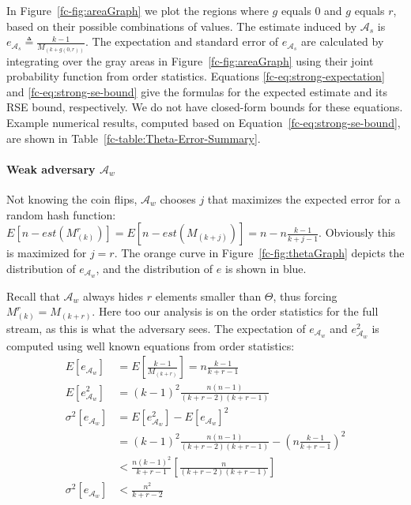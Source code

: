 In Figure~\ref{fc-fig:areaGraph} we plot the regions where $g$ equals $0$
and $g$ equals $r$, based on their possible combinations of values. The estimate
induced by ${\mathcal{A}}_s$ is $e_{{\mathcal{A}}_s} \triangleq \frac{k-1}{M_{(k+g(0,r))}}$. The expectation
and standard error of $e_{{\mathcal{A}}_s}$ are calculated by integrating over the gray areas
in Figure~\ref{fc-fig:areaGraph} using their joint probability function from order statistics. %
Equations \ref{fc-eq:strong-expectation} and \ref{fc-eq:strong-se-bound} give
the formulas for the expected estimate and its RSE bound, respectively. We do not have
closed-form bounds for these equations. Example numerical results, computed based on Equation~\ref{fc-eq:strong-se-bound}, are
shown in Table~\ref{fc-table:Theta-Error-Summary}.

\paragraph{Weak adversary ${\mathcal{A}}_w$} Not knowing the coin flips, ${\mathcal{A}}_w$ chooses $j$
that maximizes the expected error for a random hash function:
$E[n-est(M^r_{(k)})]=E[n-est(M_{(k+j)})]=n-n\frac{k-1}{k+j-1}$. Obviously this
is maximized for $j=r$. The orange curve in Figure~\ref{fc-fig:thetaGraph} depicts
the distribution of $e_{{\mathcal{A}}_w}$, and the distribution of $e$ is shown in blue.

Recall that ${\mathcal{A}}_w$ always hides $r$ elements smaller than $\Theta$, thus
forcing $M^r_{(k)}=M_{(k+r)}$. Here too our analysis is on the order statistics for the full stream, as this is what the adversary sees.
The expectation of $e_{{\mathcal{A}}_w}$ and $e_{{\mathcal{A}}_w}^2$ is computed using well known equations from order statistics:
\begin{align*}
    E[e_{{\mathcal{A}}_w}]&=E\left[ \frac{k-1}{M_{(k+r)}} \right]=n\frac{k-1}{k+r-1} \\
    E[e_{{\mathcal{A}}_w}^2]&=(k-1)^2\frac{n(n-1)}{(k+r-2)(k+r-1)} \\
    \sigma^2[e_{{\mathcal{A}}_w}] &= E[e_{{\mathcal{A}}_w}^2] - E[e_{{\mathcal{A}}_w}]^2 \\
    &=(k-1)^2\frac{n(n-1)}{(k+r-2)(k+r-1)} - \left(n\frac{k-1}{k+r-1} \right)^2 \\
    &< \frac{n(k-1)^2}{k+r-1}\left[\frac{n}{(k+r-2)(k+r-1)}\right] \\
    \sigma^2[e_{{\mathcal{A}}_w}] &< \frac{n^2}{k+r-2}
\end{align*}

